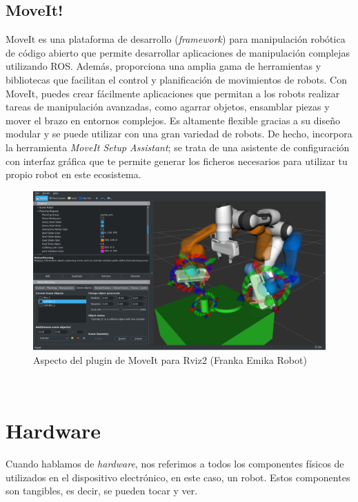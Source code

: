 \subsection{MoveIt!}
\label{subsec:moveit}
MoveIt es una plataforma de desarrollo (\textit{framework}) para manipulación robótica de código abierto que permite desarrollar 
aplicaciones de manipulación complejas utilizando ROS. Además, proporciona una amplia gama de herramientas y bibliotecas que 
facilitan el control y planificación de movimientos de robots. Con MoveIt, puedes crear fácilmente aplicaciones que permitan
a los robots realizar tareas de manipulación avanzadas, como agarrar objetos, ensamblar piezas y mover el brazo en entornos complejos. 
Es altamente flexible gracias a su diseño modular y se puede utilizar con una gran variedad de robots. De hecho, incorpora la herramienta 
\textit{MoveIt Setup Assistant}; se trata de una asistente de configuración con interfaz gráfica que te permite generar los ficheros 
necesarios para utilizar tu propio robot en este ecosistema. 
\begin{figure} [h!]
  \begin{center}
    \includegraphics[width=12cm]{figs/moveit_intro.png}
  \end{center}
  \caption{Aspecto del plugin de MoveIt para Rviz2 (Franka Emika Robot)}
  \label{fig:ros2logo}
\end{figure}\ 

\section{Hardware}
\label{sec:hardware}
Cuando hablamos de \textit{hardware}, nos referimos a todos los componentes físicos de utilizados en el dispositivo electrónico, en este caso, un robot. Estos 
componentes son tangibles, es decir, se pueden tocar y ver.

